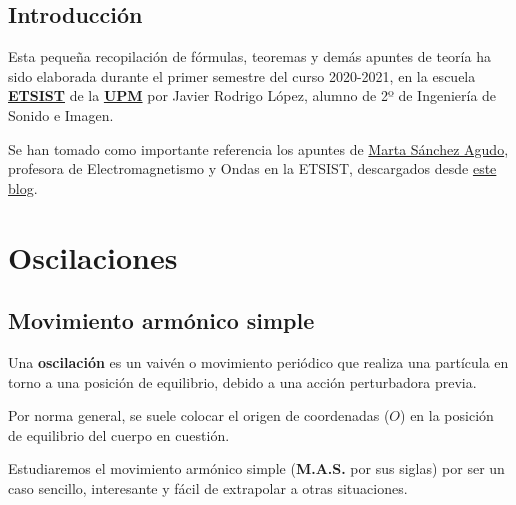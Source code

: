 \documentclass[a4paper]{book}
\numberwithin{figure}{chapter}
\numberwithin{equation}{chapter}
\newcommand{\mas}{M.A.S.}
\begin{document}
\newpage
{}
{}
\section*{Introducción}
Esta pequeña recopilación de fórmulas, teoremas y demás apuntes de teoría ha sido elaborada durante el primer semestre del curso 2020-2021, en la escuela \href{https://www.etsist.upm.es/}{\textbf{ETSIST}} de la \href{http://www.upm.es/}{\textbf{UPM}} por Javier Rodrigo López, alumno de 2º de Ingeniería de Sonido e Imagen.

Se han tomado como importante referencia los apuntes de \href{https://www.etsist.upm.es/escuela/departamentos/EF/personal?departamento=EFF&idTrabajador=02819b0c47b0eac780a7d0e336d9862b}{Marta Sánchez Agudo}, profesora de Electromagnetismo y Ondas en la ETSIST, descargados desde \href{https://apuntesupmcampussur.wordpress.com/}{este blog}.


\newpage

\setlength{\parskip}{0em}
\tableofcontents
\setlength{\parskip}{0.5em}


\chapter{Oscilaciones}

\section{Movimiento armónico simple}
Una \textbf{oscilación} es un  vaivén o movimiento periódico que realiza una partícula en torno a una posición de equilibrio, debido a una acción perturbadora previa.

Por norma general, se suele colocar el origen de coordenadas ($O$) en la posición de equilibrio del cuerpo en cuestión.

Estudiaremos el movimiento armónico simple (\textbf{\mas} por sus siglas) por ser un caso sencillo, interesante y fácil de extrapolar a otras situaciones.
\end{document}
